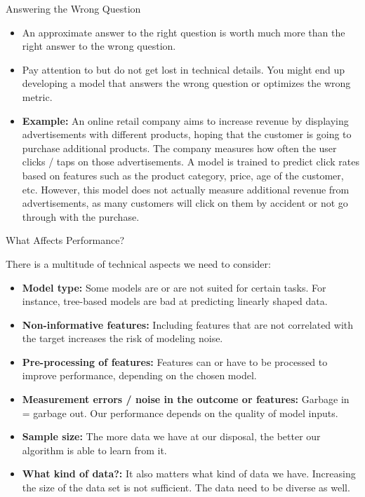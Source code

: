 \documentclass[11pt,compress,t,notes=noshow, aspectratio=169, xcolor=table]{beamer}
\begin{document}
\begin{frame}{Answering the Wrong Question}
\begin{itemize}
\setlength\itemsep{1em}
    \item An approximate answer to the right question is worth much more than the right answer to the wrong question.
    \item Pay attention to but do not get lost in technical details. You might end up developing a model that answers the wrong question or optimizes the wrong metric.
    \item \textbf{Example:} An online retail company aims to increase revenue by displaying advertisements with different products, hoping that the customer is going to purchase additional products. The company measures how often the user clicks / taps on those advertisements. A model is trained to predict click rates based on features such as the product category, price, age of the customer, etc. However, this model does not actually measure additional revenue from advertisements, as many customers will click on them by accident or not go through with the purchase.
\end{itemize}
    
\end{frame}
\begin{frame}{What Affects Performance?}

There is a multitude of technical aspects we need to consider:
\vspace{1em}
\begin{itemize}
\setlength\itemsep{1em}
    \item \textbf{Model type:} Some models are or are not suited for certain tasks. For instance, tree-based models are bad at predicting linearly shaped data.
    \item \textbf{Non-informative features:} Including features that are not correlated with the target increases the risk of modeling noise.
    \item \textbf{Pre-processing of features:} Features can or have to be processed to improve performance, depending on the chosen model.
    \item \textbf{Measurement errors / noise in the outcome or features:} Garbage in = garbage out. Our performance depends on the quality of model inputs.
    \item \textbf{Sample size:} The more data we have at our disposal, the better our algorithm is able to learn from it.
    \item \textbf{What kind of data?:} It also matters what kind of data we have. Increasing the size of the data set is not sufficient. The data need to be diverse as well.
\end{itemize}
\end{frame}
\end{document}
